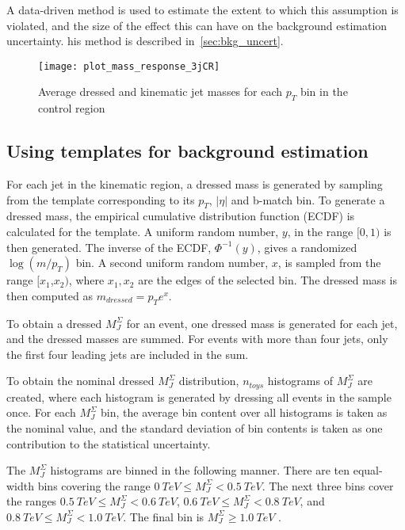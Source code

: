 A data-driven method is used to estimate the extent to which this assumption is violated,
and the size of the effect this can have on the background estimation uncertainty.
his method is described in~\ref{sec:bkg_uncert}.

\begin{figure}[!ht]
    \texttt{[image: plot\_mass\_response\_3jCR]}
    \centering
    \caption{Average dressed and kinematic jet masses for each $p_T$ bin
    in the control region}
    \label{fig:response_3jCR}

\end{figure}

\subsection{Using templates for background estimation}\label{subsec:template_method}

For each jet in the kinematic region, a dressed mass is generated by sampling from the template corresponding to its $p_T$, $|\eta|$ and b-match bin.
To generate a dressed mass, the empirical cumulative distribution function (ECDF) is calculated for the template.
A uniform random number, $y$, in the range $[0,1)$ is then generated.
The inverse of the ECDF, $\Phi^{-1}(y)$, gives a randomized $\log\left(m/p_T\right)$ bin.
A second uniform random number, $x$, is sampled from the range $[x_1$,$x_2)$, where $x_1,x_2$ are the edges of the selected bin.
The dressed mass is then computed as $m_{dressed} = p_{T}e^x$.

To obtain a dressed $M_{J}^{\Sigma}$ for an event, one dressed mass is generated for each jet, and the dressed masses are summed.
For events with more than four jets, only the first four leading jets are included in the sum.

To obtain the nominal dressed $M_{J}^{\Sigma}$ distribution, $n_{toys}$ histograms of $M_{J}^{\Sigma}$ are created, where each histogram is generated by dressing all events in the sample once.
For each $M_{J}^{\Sigma}$ bin, the average bin content over all histograms is taken as the nominal value, and the standard deviation of bin contents is taken as one contribution to the statistical uncertainty.

The $M_{J}^{\Sigma}$ histograms are binned in the following manner.
There are ten equal-width bins covering the range $0~TeV \leq M_{J}^{\Sigma} < 0.5~TeV$.
The next three bins cover the ranges $0.5~TeV \leq M_{J}^{\Sigma} < 0.6~TeV$, $0.6~TeV \leq M_{J}^{\Sigma} < 0.8~TeV$,
and $0.8~TeV \leq M_{J}^{\Sigma} < 1.0~TeV$.
The final bin is $M_{J}^{\Sigma} \geq 1.0~TeV$ .

